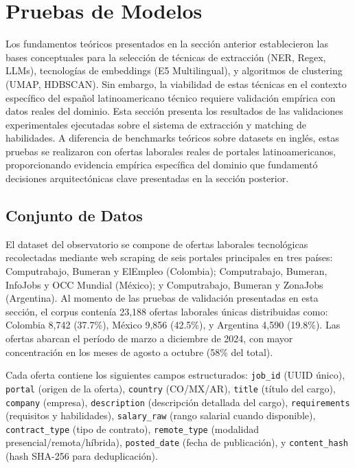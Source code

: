 \section{Pruebas de Modelos}

Los fundamentos teóricos presentados en la sección anterior establecieron las bases conceptuales para la selección de técnicas de extracción (NER, Regex, LLMs), tecnologías de embeddings (E5 Multilingual), y algoritmos de clustering (UMAP, HDBSCAN). Sin embargo, la viabilidad de estas técnicas en el contexto específico del español latinoamericano técnico requiere validación empírica con datos reales del dominio. Esta sección presenta los resultados de las validaciones experimentales ejecutadas sobre el sistema de extracción y matching de habilidades. A diferencia de benchmarks teóricos sobre datasets en inglés, estas pruebas se realizaron con ofertas laborales reales de portales latinoamericanos, proporcionando evidencia empírica específica del dominio que fundamentó decisiones arquitectónicas clave presentadas en la sección posterior.

\subsection{Conjunto de Datos}

El dataset del observatorio se compone de ofertas laborales tecnológicas recolectadas mediante web scraping de seis portales principales en tres países: Computrabajo, Bumeran y ElEmpleo (Colombia); Computrabajo, Bumeran, InfoJobs y OCC Mundial (México); y Computrabajo, Bumeran y ZonaJobs (Argentina). Al momento de las pruebas de validación presentadas en esta sección, el corpus contenía 23,188 ofertas laborales únicas distribuidas como: Colombia 8,742 (37.7\%), México 9,856 (42.5\%), y Argentina 4,590 (19.8\%). Las ofertas abarcan el período de marzo a diciembre de 2024, con mayor concentración en los meses de agosto a octubre (58\% del total).

Cada oferta contiene los siguientes campos estructurados: \texttt{job\_id} (UUID único), \texttt{portal} (origen de la oferta), \texttt{country} (CO/MX/AR), \texttt{title} (título del cargo), \texttt{company} (empresa), \texttt{description} (descripción detallada del cargo), \texttt{requirements} (requisitos y habilidades), \texttt{salary\_raw} (rango salarial cuando disponible), \texttt{contract\_type} (tipo de contrato), \texttt{remote\_type} (modalidad presencial/remota/híbrida), \texttt{posted\_date} (fecha de publicación), y \texttt{content\_hash} (hash SHA-256 para deduplicación).

